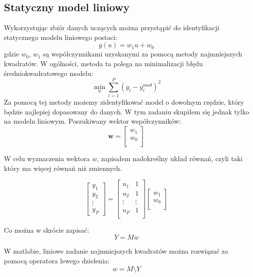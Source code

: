 \documentclass[a4paper,titlepage,11pt,floatssmall]{mwrep}
\begin{document}
\subsection{Statyczny model liniowy}
\indent Wykorzystując zbiór danych uczących można przystąpić do identyfikacji statycznego modelu liniowego postaci:
\begin{equation*}
y(u) = w_1u + w_0
\end{equation*}
gdzie $w_0$, $w_1$ są współczynnikami uzyskanymi za pomocą metody najmniejszych kwadratów. W ogólności, metoda ta polega na minimalizacji błędu średniokwadratowego modelu:
\begin{equation*}
\min_{w} \sum_{i=1}^{P} (y_i - y_i^{mod})^2
\end{equation*}
Za pomocą tej metody możemy zidentyfikować model o dowolnym rzędzie, który będzie najlepiej dopasowany do danych. W tym zadaniu skupiłem się jednak tylko na modelu liniowym. Poszukiwany wektor współczynników:
$$
\mathbf{w} =
\left[\begin{array}{c}
w_1 \\
w_0 \\
\end{array} \right]
$$
\newpage

W celu wyznaczenia wektora $w$, zapisałem nadokreślny układ równań, czyli taki który ma więcej równań niż zmiennych. 

$$
\left[\begin{array}{c}
y_1 \\
y_2 \\
\vdots \\
y_P
\end{array} \right] 
=
\left[ \begin{array}{cc}
u_1 & 1  \\
u_2 & 1 \\
\vdots & \vdots \\
u_P & 1\\
\end{array} \right]
\left[\begin{array}{c}
w_1 \\
w_0 \\
\end{array} \right]
$$

Co można w skrócie zapisać:
\begin{equation*}
Y = Mw
\end{equation*}

W matlabie, liniowe zadanie najmniejszych kwadratów można rozwiązać za pomocą operatora lewego dzielenia:
\begin{equation*}
w = M \setminus Y
\end{equation*}
\end{document}
